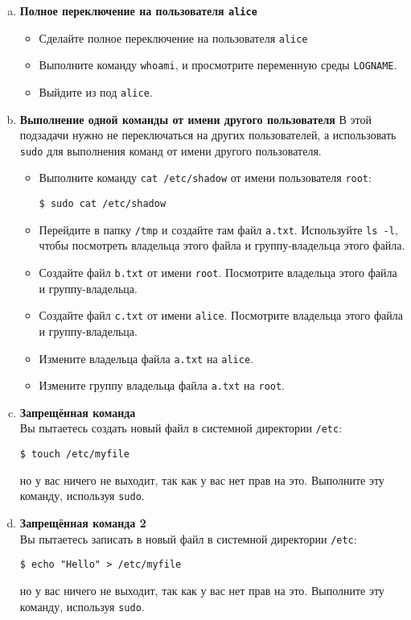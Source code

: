 \documentclass{article}
\begin{document}
\begin{enumerate}[a.]
\item \textbf{Полное переключение на пользователя \texttt{alice}}
\begin{itemize}
\item Сделайте полное переключение на пользователя \texttt{alice}
\item Выполните команду \texttt{whoami}, и просмотрите переменную среды \texttt{LOGNAME}.
\item Выйдите из под \texttt{alice}.
\end{itemize}

\item \textbf{Выполнение одной команды от имени другого пользователя}
В этой подзадачи нужно не переключаться на других пользователей, а использовать \texttt{sudo} для выполнения команд от имени другого пользователя.
\begin{itemize}
\item Выполните команду \texttt{cat /etc/shadow} от имени пользователя \texttt{root}:
\begin{lstlisting}
$ sudo cat /etc/shadow
\end{lstlisting}

\item Перейдите в папку \texttt{/tmp} и создайте там файл \texttt{a.txt}. Используйте \texttt{ls -l}, чтобы посмотреть владельца этого файла и группу-владельца этого файла.

\item Создайте файл \texttt{b.txt} от имени \texttt{root}. Посмотрите владельца этого файла и группу-владельца.

\item Создайте файл \texttt{c.txt} от имени \texttt{alice}. Посмотрите владельца этого файла и группу-владельца.

\item Измените владельца файла \texttt{a.txt} на \texttt{alice}.
\item Измените группу владельца файла \texttt{a.txt} на \texttt{root}.
\end{itemize}

\item \textbf{Запрещённая команда}\\
Вы пытаетесь создать новый файл в системной директории \texttt{/etc}:
\begin{lstlisting}
$ touch /etc/myfile
\end{lstlisting}
но у вас ничего не выходит, так как у вас нет прав на это. Выполните эту команду, используя \texttt{sudo}.

\item \textbf{Запрещённая команда 2}\\
Вы пытаетесь записать в новый файл в системной директории \texttt{/etc}:
\begin{lstlisting}
$ echo "Hello" > /etc/myfile
\end{lstlisting}
но у вас ничего не выходит, так как у вас нет прав на это. Выполните эту команду, используя \texttt{sudo}.


\end{enumerate}
\end{document}
